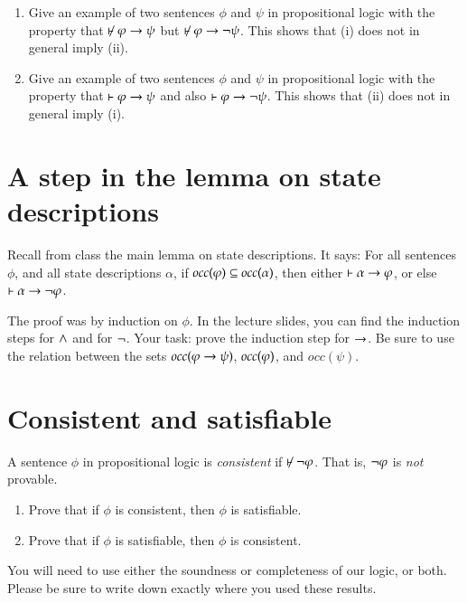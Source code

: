 \documentclass[12pt]{article}
\begin{document}
{\begin{enumerate}
\item Give an example of two sentences $\phi$ and $\psi$ in propositional logic 
with the property that $\not\proves \phi\iif \psi$ but    $ \not\proves \phi\iif \nott\psi$.
This shows that (i) does not in general imply (ii).
\item Give an example of two sentences $\phi$ and $\psi$ in propositional logic 
with the property that $\vdash \varphi\rightarrow \psi$ and also   $ \vdash \varphi\rightarrow \neg\psi$.
This shows that (ii) does not in general imply (i).
\end{enumerate}

 
\section{A step in the lemma on state descriptions}
Recall from class the main lemma on state descriptions.
It says:   For all sentences $\phi$, 
and all state descriptions $\alpha$, 
if $\mbox{\em occ}(\varphi)\subseteq \mbox{\em occ}(\alpha)$, then 
  either $\vdash \alpha\rightarrow \varphi$, or else $\vdash \alpha\rightarrow \neg\varphi$.

The proof was by induction on $\phi$.  In the lecture slides, you can find the induction steps for $\wedge$ and for $\neg$.
Your task: prove the induction step for $\rightarrow$.
Be sure to use the relation between the sets $\mbox{\em occ}(\varphi\rightarrow\psi)$, $\mbox{\em occ}(\varphi)$, and $occ(\psi)$.


 \section{Consistent and satisfiable}
 
 A sentence $\phi$ in propositional logic  is \emph{consistent} if $\not\proves\nott \phi$.
That is, $\neg\varphi$ is \emph{not} provable.  

\begin{enumerate}
\item 
Prove that if $\phi$ is consistent, then $\phi$ is satisfiable.
\item
Prove that if $\phi$ is satisfiable, then $\phi$ is consistent.
\end{enumerate}
You will need to use either the soundness or completeness of our logic, or both.
    Please be sure to write down exactly where
you used these results.
}
\end{document}
